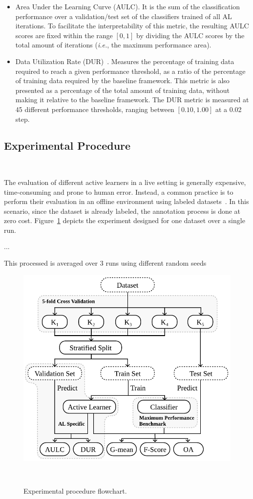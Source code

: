 \documentclass[parskip=full]{scrartcl}
\begin{document}
\begin{itemize}

    \item Area Under the Learning Curve (AULC). It is the sum of the
        classification performance over a validation/test set of the
        classifiers trained of all AL iterations. To facilitate the
        interpretability of this metric, the resulting AULC scores are fixed
        within the range $[0, 1]$ by dividing the AULC scores by the total
        amount of iterations (\textit{i.e.}, the maximum performance area).

    \item Data Utilization Rate (DUR)~\cite{Reitmaier2013}. Measures the
        percentage of training data required to reach a given performance
        threshold, as a ratio of the percentage of training data required by
        the baseline framework. This metric is also presented as a percentage
        of the total amount of training data, without making it relative to
        the baseline framework. The DUR metric is measured at 45 different
        performance thresholds, ranging between $[0.10, 1.00]$ at a 0.02 step.

\end{itemize}

\subsection{Experimental Procedure}~\label{sec:experimental_procedure}

The evaluation of different active learners in a live setting is generally
expensive, time-consuming and prone to human error. Instead, a common practice
is to perform their evaluation in an offline environment using labeled
datasets~\cite{Kagy2019}. In this scenario, since the dataset is already
labeled, the annotation process is done at zero cost.
Figure~\ref{fig:experimental_procedure} depicts the experiment designed for
one dataset over a single run.

...

This processed is averaged over 3 runs using different random seeds

\begin{figure}[H]
	\centering
	\includegraphics[width=.6\linewidth]{../analysis/experimental_procedure}
    \caption{%
        Experimental procedure flowchart.
    }~\label{fig:experimental_procedure}
\end{figure}
\end{document}
